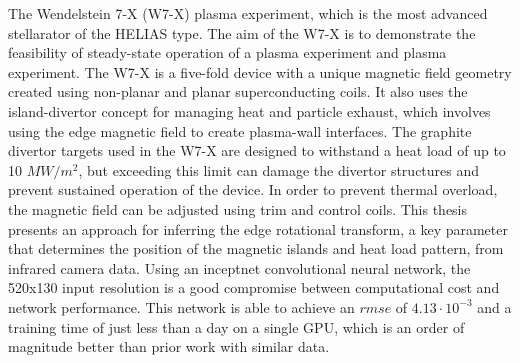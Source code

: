 %
\label{sec:abstract}

The Wendelstein 7-X (W7-X) plasma experiment, which is the most advanced stellarator of the HELIAS type. The aim of the W7-X is to demonstrate the feasibility of steady-state operation of a plasma experiment and plasma experiment. The W7-X is a five-fold device with a unique magnetic field geometry created using non-planar and planar superconducting coils. It also uses the island-divertor concept for managing heat and particle exhaust, which involves using the edge magnetic field to create plasma-wall interfaces. The graphite divertor targets used in the W7-X are designed to withstand a heat load of up to 10 $MW/m^2$, but exceeding this limit can damage the divertor structures and prevent sustained operation of the device. In order to prevent thermal overload, the magnetic field can be adjusted using trim and control coils. This thesis presents an approach for inferring the edge rotational transform, a key parameter that determines the position of the magnetic islands and heat load pattern, from infrared camera data. Using an inceptnet convolutional neural network, the 520x130 input resolution is a good compromise between computational cost and network performance. This network is able to achieve an $rmse$ of $4.13 \cdot 10^{-3}$ and a training time of just less than a day on a single GPU, which is an order of magnitude better than prior work with similar data.